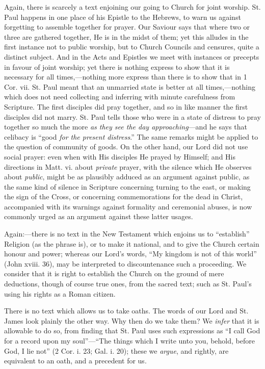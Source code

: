 Again, there is scarcely a text enjoining our going to Church for
joint worship. St. Paul happens in one place of his Epistle to the
Hebrews, to warn us against forgetting to assemble together for
prayer. Our Saviour says that where two or three are gathered
together, He is in the midst of them; yet this alludes in the first
instance not to public worship, but to Church Councils and censures,
quite a distinct subject. And in the Acts and Epistles we meet with
instances or precepts in favour of joint worship; yet there is nothing
express to show that it is necessary for all times,—nothing more
express than there is to show that in 1 Cor. vii. St. Paul meant that
an unmarried state is better at all times,—nothing which does not
need collecting and inferring with minute carefulness from Scripture.
The first disciples did pray together, and so in like manner the first
disciples did not marry. St. Paul tells those who were in a state of
distress to pray together so much the more \emph{as they see the day
approaching}—and he says that celibacy is ``good \emph{for the
present distress}.'' The same remarks might be applied to the
question of community of goods. On the other hand, our Lord did not
use social prayer: even when with His disciples He prayed by Himself;
and His directions in Matt. vi. about \emph{private} prayer, with the
silence which He observes about \emph{public}, might be as plausibly
adduced as an argument against public, as the same kind of silence in
Scripture concerning turning to the east, or making the sign of the
Cross, or concerning commemorations for the dead in Christ, accompanied with its warnings against formality and ceremonial abuses,
is now commonly urged as an argument against these latter usages.

Again:—there is no text in the New Testament which enjoins us to
``establish'' Religion (as the phrase is), or to make it
national, and to give the Church certain honour and power; whereas our
Lord's words, ``My kingdom is not of this world'' (John xviii.
36), may be interpreted to discountenance such a proceeding. We
consider that it is right to establish the Church on the ground of
mere deductions, though of course true ones, from the sacred text;
such as St. Paul's using his rights as a Roman citizen.

There is no text which allows us to take oaths. The words of our
Lord and St. James look plainly the other way. Why then do we take
them? We \emph{infer} that it is allowable to do so, from finding that St.
Paul uses such expressions as ``I call God for a record upon my
soul''—``The things which I write unto you, behold, before
God, I lie not'' (2 Cor. i. 23; Gal. i. 20); these we \emph{argue},
and rightly, are equivalent to an oath, and a precedent for us.

